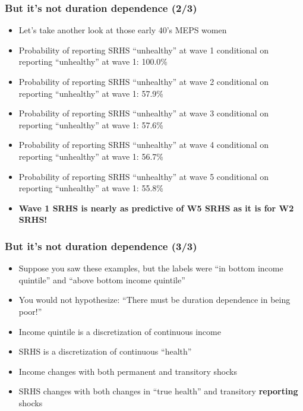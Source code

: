 \documentclass[aspectratio=169]{beamer}
\begin{document}
\begin{frame}\frametitle{But it's not duration dependence  (2/3)}
\begin{itemize}
	\item <1->Let's take another look at those early 40's MEPS women
	
	\item <1->Probability of reporting SRHS ``unhealthy'' at wave 1 conditional on reporting ``unhealthy'' at wave 1: 100.0\%
	
	\item <2->Probability of reporting SRHS ``unhealthy'' at wave 2 conditional on reporting ``unhealthy'' at wave 1: 57.9\%
	
	\item <3->Probability of reporting SRHS ``unhealthy'' at wave 3 conditional on reporting ``unhealthy'' at wave 1: 57.6\%
	
	\item <4->Probability of reporting SRHS ``unhealthy'' at wave 4 conditional on reporting ``unhealthy'' at wave 1: 56.7\%
	
	\item <5->Probability of reporting SRHS ``unhealthy'' at wave 5 conditional on reporting ``unhealthy'' at wave 1: 55.8\%
	
	\item <6->\textbf{Wave 1 SRHS is nearly as predictive of W5 SRHS as it is for W2 SRHS!}
\end{itemize}
\end{frame}


\begin{frame}\frametitle{But it's not duration dependence (3/3)}
\begin{itemize}
	\item <1->Suppose you saw these examples, but the labels were ``in bottom income quintile'' and ``above bottom income quintile''
	
	\item <2->You would not hypothesize: ``There must be duration dependence in being poor!''
	
	\item <3->Income quintile is a discretization of continuous income
	
	\item <3->SRHS is a discretization of continuous ``health''
	
	\item <4->Income changes with both permanent and transitory shocks
	
	\item <4->SRHS changes with both changes in ``true health'' and transitory \textbf{reporting} shocks
\end{itemize}
\end{frame}
\end{document}
